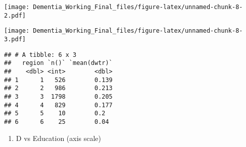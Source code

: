 \documentclass[]{article}
\newenvironment{Shaded}{\begin{snugshade}}{\end{snugshade}}
\newcommand{\DecValTok}[1]{\textcolor[rgb]{0.00,0.00,0.81}{#1}}
\newcommand{\KeywordTok}[1]{\textcolor[rgb]{0.13,0.29,0.53}{\textbf{#1}}}
\newcommand{\NormalTok}[1]{#1}
\newcommand{\OperatorTok}[1]{\textcolor[rgb]{0.81,0.36,0.00}{\textbf{#1}}}
\newcommand{\StringTok}[1]{\textcolor[rgb]{0.31,0.60,0.02}{#1}}
\providecommand{\tightlist}{%
  \setlength{\itemsep}{0pt}\setlength{\parskip}{0pt}}
\begin{document}
\texttt{[image: Dementia\_Working\_Final\_files/figure-latex/unnamed-chunk-8-2.pdf]}

\begin{Shaded}
\end{Shaded}

\texttt{[image: Dementia\_Working\_Final\_files/figure-latex/unnamed-chunk-8-3.pdf]}

\begin{Shaded}
\end{Shaded}

\begin{verbatim}
## # A tibble: 6 x 3
##   region `n()` `mean(dwtr)`
##    <dbl> <int>        <dbl>
## 1      1   526        0.139
## 2      2   986        0.213
## 3      3  1798        0.205
## 4      4   829        0.177
## 5      5    10        0.2  
## 6      6    25        0.04
\end{verbatim}

\begin{enumerate}
\def\labelenumi{\alph{enumi}.}
\setcounter{enumi}{3}
\tightlist
\item
  D vs Education (axis scale)
\end{enumerate}
\end{document}
